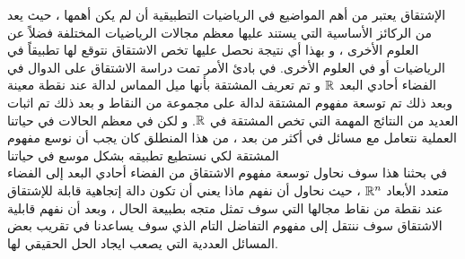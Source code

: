 الإشتقاق يعتبر من أهم المواضيع في الرياضيات التطبيقية أن لم يكن أهمها ، حيث يعد من الركائز الأساسية التي يستند عليها معظم مجالات الرياضيات المختلفة فضلاً عن العلوم الأخرى ، و بهذا أي نتيجة نحصل عليها تخص الاشتقاق نتوقع لها تطبيقاً في الرياضيات أو في العلوم الأخرى. في بادئ الأمر تمت دراسة الاشتقاق على الدوال في الفضاء أحادي البعد $\mathbb{R}$ و تم تعريف المشتقة بأنها ميل المماس لدالة عند نقطة معينة وبعد ذلك تم توسعة مفهوم المشتقة لدالة على مجموعة من النقاط و بعد ذلك تم اثبات العديد من النتائج المهمة التي تخص المشتقة في $\mathbb{R}$. و لكن في معظم الحالات في حياتنا العملية نتعامل مع مسائل في أكثر من بعد ، من هذا المنطلق كان يجب أن نوسع مفهوم المشتقة لكي نستطيع تطبيقه بشكل موسع في حياتنا\\
في بحثنا هذا سوف نحاول توسعة مفهوم الاشتقاق من الفضاء أحادي البعد إلى الفضاء متعدد الأبعاد $\mathbb{R}^n$ ، حيث نحاول أن نفهم ماذا يعني أن تكون دالة إتجاهية قابلة للإشتقاق عند نقطة من نقاط مجالها التي سوف تمثل متجه بطبيعة الحال ، وبعد أن نفهم قابلية الاشتقاق سوف ننتقل إلى مفهوم التفاضل التام الذي سوف يساعدنا في تقريب بعض المسائل العددية التي يصعب ايجاد الحل الحقيقي لها.
